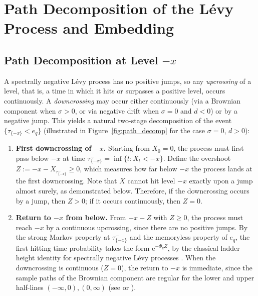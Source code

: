 \documentclass[a4paper,11pt]{article}
\numberwithin{equation}{section}
\theoremstyle{plain}
\theoremstyle{definition}
\newcommand{\1}{\mathbf{1}}
\newcommand{\e}{\mathrm{e}}
\begin{document}
\section{Path Decomposition of the L\'evy Process and Embedding}\label{sec:main_result_scale_function_representation}


\subsection{Path Decomposition at Level $-x$}\label{sec:path_decomp}
A spectrally negative Lévy process has no positive jumps, so any \emph{upcrossing} of a level, that is, a time in which it hits or surpasses a positive level, occurs continuously.
A \emph{downcrossing} may occur either continuously (via a Brownian component when $\sigma > 0$, or via negative drift when $\sigma = 0$ and $d < 0$) or by a negative jump. This yields a natural two-stage decomposition of the event $\{\tau_{\{-x\}} < e_q\}$ (illustrated in Figure~\ref{fig:path_decomp} for the case $\sigma = 0$, $d > 0$): 
\begin{enumerate}
\item \textbf{First downcrossing of $-x$.} Starting from $X_0 = 0$, the process must first pass below $-x$ at time $\tau^-_{\{-x\}} = \inf\{t : X_t < -x\}$.
Define the overshoot $Z := -x - X_{\tau^-_{\{-x\}}} \ge 0$, which measures how far below $-x$ the process lands at the first downcrossing. 
Note that $X$ cannot hit level $-x$ exactly upon a jump almost surely, as demonstrated below.
Therefore, if the downcrossing occurs by a jump, then $Z > 0$; if it occurs continuously, then $Z = 0$.


\item \textbf{Return to $-x$ from below.} From $-x - Z$ with $Z \ge 0$, the process must reach $-x$ by a continuous upcrossing, since there are no positive jumps. 
By the strong Markov property at $\tau^-_{\{-x\}}$ and the memoryless property of $e_q$, the first hitting time probability takes the form $\e^{-\Phi_q Z}$, by the classical ladder height identity for spectrally negative Lévy processes \cite[Theorem 3.12]{Kyprianou2014}. 
When the downcrossing is continuous ($Z = 0$), the return to $-x$ is immediate, since the sample paths of the Brownian component are regular for the lower and upper half-lines $(-\infty, 0), ( 0,\infty)$ (see \cite{MR0242261} or \cite[Lemma 6]{MR4130409}).

\end{enumerate}
\end{document}
